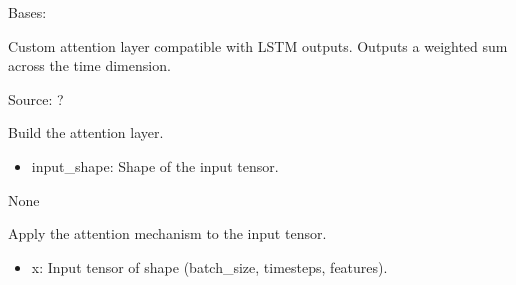 \documentclass[letterpaper,10pt,english]{sphinxmanual}
\begin{document}
\begin{fulllineitems}
\label{\detokenize{lstm_attention_model:lstm_attention_model.AttentionLayer}}
\pysigstartsignatures
{}
\pysigstopsignatures
\sphinxAtStartPar
Bases: 

\sphinxAtStartPar
Custom attention layer compatible with LSTM outputs.
Outputs a weighted sum across the time dimension.

\sphinxAtStartPar
Source: ?

\begin{fulllineitems}
\label{\detokenize{lstm_attention_model:lstm_attention_model.AttentionLayer.build}}
\pysigstartsignatures
{}
\pysigstopsignatures
\sphinxAtStartPar
Build the attention layer.
\begin{description}
\begin{itemize}
\item {} 
\sphinxAtStartPar
input\_shape: Shape of the input tensor.

\end{itemize}

\sphinxAtStartPar
None

\end{description}

\end{fulllineitems}


\begin{fulllineitems}
\label{\detokenize{lstm_attention_model:lstm_attention_model.AttentionLayer.call}}
\pysigstartsignatures
{}
\pysigstopsignatures
\sphinxAtStartPar
Apply the attention mechanism to the input tensor.
\begin{description}
\begin{itemize}
\item {} 
\sphinxAtStartPar
x: Input tensor of shape (batch\_size, timesteps, features).


\end{itemize}
\end{description}
\end{fulllineitems}
\end{fulllineitems}
\end{document}
